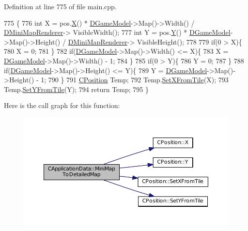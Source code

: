 Definition at line 775 of file main.\+cpp.


\begin{DoxyCode}
775                                                                     \{
776     \textcolor{keywordtype}{int} X = pos.\hyperlink{classCPosition_a9a6b94d3b91df1492d166d9964c865fc}{X}() * \hyperlink{classCApplicationData_a32b50c7c1cbac3cfd67c7f775b1d6fee}{DGameModel}->Map()->Width() / \hyperlink{classCApplicationData_a59b0f5dfe30ed5a54dd28aee98109e34}{DMiniMapRenderer}->
      VisibleWidth();
777     \textcolor{keywordtype}{int} Y = pos.\hyperlink{classCPosition_a1aa8a30e2f08dda1f797736ba8c13a87}{Y}() * \hyperlink{classCApplicationData_a32b50c7c1cbac3cfd67c7f775b1d6fee}{DGameModel}->Map()->Height() / \hyperlink{classCApplicationData_a59b0f5dfe30ed5a54dd28aee98109e34}{DMiniMapRenderer}->
      VisibleHeight();
778     
779     \textcolor{keywordflow}{if}(0 > X)\{
780         X = 0;    
781     \}
782     \textcolor{keywordflow}{if}(\hyperlink{classCApplicationData_a32b50c7c1cbac3cfd67c7f775b1d6fee}{DGameModel}->Map()->Width() <= X)\{
783         X = \hyperlink{classCApplicationData_a32b50c7c1cbac3cfd67c7f775b1d6fee}{DGameModel}->Map()->Width() - 1;   
784     \}
785     \textcolor{keywordflow}{if}(0 > Y)\{
786         Y = 0;    
787     \}
788     \textcolor{keywordflow}{if}(\hyperlink{classCApplicationData_a32b50c7c1cbac3cfd67c7f775b1d6fee}{DGameModel}->Map()->Height() <= Y)\{
789         Y = \hyperlink{classCApplicationData_a32b50c7c1cbac3cfd67c7f775b1d6fee}{DGameModel}->Map()->Height() - 1;   
790     \}
791     \hyperlink{classCPosition}{CPosition} Temp;
792     Temp.\hyperlink{classCPosition_ac6a1eeaeb98e20942efea7cf253b2ec4}{SetXFromTile}(X);
793     Temp.\hyperlink{classCPosition_a4be1caa5ce58297e9d371f6bc1db32d9}{SetYFromTile}(Y);
794     \textcolor{keywordflow}{return} Temp;
795 \}
\end{DoxyCode}
Here is the call graph for this function\+:\nopagebreak
\begin{figure}[H]
\begin{center}
\leavevmode
\includegraphics[width=350pt]{classCApplicationData_a3dabde94ddec0eb2c732525f54164bc5_cgraph}
\end{center}
\end{figure}
